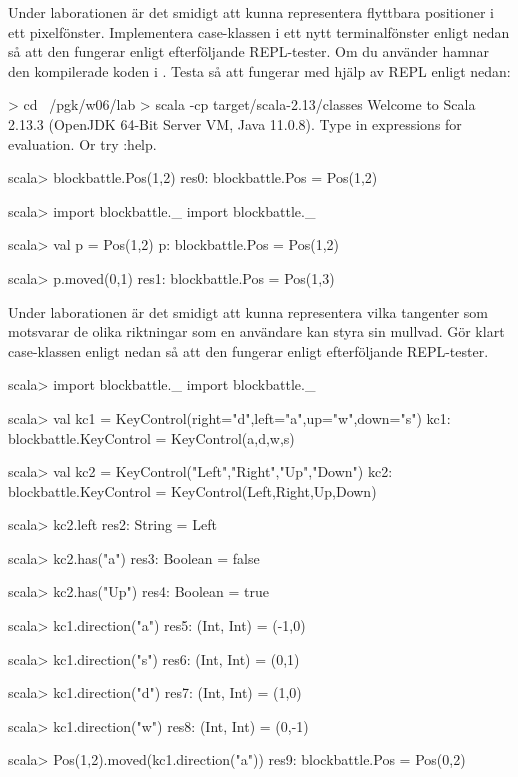 \Subtask Under laborationen är det smidigt att kunna representera flyttbara positioner i ett pixelfönster. Implementera case-klassen  i ett nytt terminalfönster enligt nedan så att den fungerar enligt efterföljande REPL-tester.
Om du använder  hamnar den kompilerade koden i . Testa så att  fungerar med hjälp av REPL enligt nedan:
\begin{REPL}
> cd ~/pgk/w06/lab
> scala -cp target/scala-2.13/classes
Welcome to Scala 2.13.3 (OpenJDK 64-Bit Server VM, Java 11.0.8).
Type in expressions for evaluation. Or try :help.

scala> blockbattle.Pos(1,2)
res0: blockbattle.Pos = Pos(1,2)

scala> import blockbattle._
import blockbattle._

scala> val p = Pos(1,2)
p: blockbattle.Pos = Pos(1,2)

scala> p.moved(0,1)
res1: blockbattle.Pos = Pos(1,3)
\end{REPL}

\Subtask Under laborationen är det smidigt att kunna representera vilka tangenter som motsvarar de olika riktningar som en användare kan styra sin mullvad. Gör klart case-klassen  enligt nedan så att den fungerar enligt efterföljande REPL-tester.
%
\begin{REPL}
scala> import blockbattle._
import blockbattle._

scala> val kc1 = KeyControl(right="d",left="a",up="w",down="s")
kc1: blockbattle.KeyControl = KeyControl(a,d,w,s)

scala> val kc2 = KeyControl("Left","Right","Up","Down")
kc2: blockbattle.KeyControl = KeyControl(Left,Right,Up,Down)

scala> kc2.left
res2: String = Left

scala> kc2.has("a")
res3: Boolean = false

scala> kc2.has("Up")
res4: Boolean = true

scala> kc1.direction("a")
res5: (Int, Int) = (-1,0)

scala> kc1.direction("s")
res6: (Int, Int) = (0,1)

scala> kc1.direction("d")
res7: (Int, Int) = (1,0)

scala> kc1.direction("w")
res8: (Int, Int) = (0,-1)

scala> Pos(1,2).moved(kc1.direction("a"))
res9: blockbattle.Pos = Pos(0,2)
\end{REPL}


